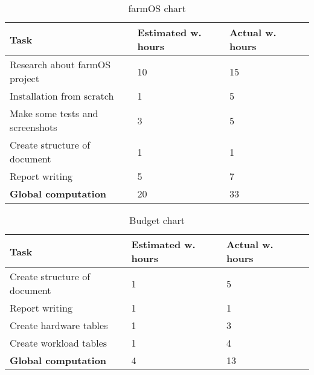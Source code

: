 \begin{table}[H]
\caption{farmOS chart}
\begin{tabular}{llll}
\hline
                               \textbf{Task}    & \textbf{Estimated w. hours} & \textbf{Actual w. hours} \\ \hline
\rowcolor{lightgray}
Research about farmOS project                   & 10                          & 15                     \\
Installation from scratch                       & 1                           & 5                      \\
\rowcolor{lightgray}
Make some tests and screenshots                 & 3                           & 5                      \\
Create structure of document                    & 1                           & 1                      \\
\rowcolor{lightgray}
Report writing                                  & 5                           & 7                     \\
\textbf{Global computation}                     & 20                          & 33                     \\
\end{tabular}
\end{table}

\begin{table}[H]
\caption{Budget chart}
\begin{tabular}{llll}
\hline
                               \textbf{Task}    & \textbf{Estimated w. hours} & \textbf{Actual w. hours} \\ \hline
\rowcolor{lightgray}
Create structure of document                    & 1                           & 5                      \\
Report writing                                  & 1                           & 1                      \\
\rowcolor{lightgray}
Create hardware tables                          & 1                           & 3                     \\
Create workload tables                          & 1                           & 4                      \\
\rowcolor{lightgray}
\textbf{Global computation}                     & 4                          & 13                     \\
\end{tabular}
\end{table}

